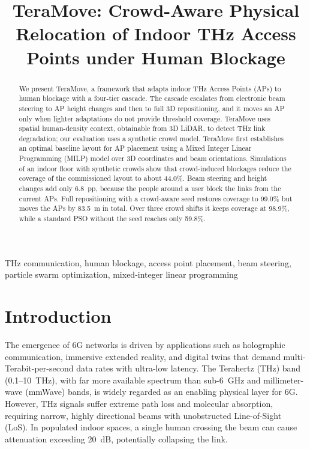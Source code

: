 \documentclass[conference]{IEEEtran}
\begin{document}
	\author{
		}

	\title{TeraMove: Crowd-Aware Physical Relocation of Indoor THz Access Points under Human Blockage}

	\maketitle

	\begin{abstract}
		We present TeraMove, a framework that adapts indoor THz Access Points (APs) to human blockage with a four-tier cascade. The cascade escalates from electronic beam steering to AP height changes and then to full 3D repositioning, and it moves an AP only when lighter adaptations do not provide threshold coverage. TeraMove
		uses spatial human-density context, obtainable from 3D LiDAR, to detect THz link degradation; our evaluation uses a synthetic crowd model.
		TeraMove first establishes an optimal baseline layout for AP placement using a Mixed Integer Linear Programming (MILP) model over 3D
		coordinates and beam orientations.
		Simulations of an indoor floor with synthetic crowds show that crowd-induced
		blockages reduce the coverage of the commissioned layout to about 44.0\%. Beam steering and height changes add only 6.8~pp, because the people around a user block the links from the current APs. Full repositioning with a crowd-aware seed restores coverage to 99.0\% but moves the APs by 83.5~m in total. Over three crowd shifts it keeps coverage at 98.9\%, while a standard PSO without the seed reaches only 59.8\%.
	\end{abstract}

	\begin{IEEEkeywords}
		THz communication, human blockage, access point placement, beam steering, particle swarm optimization, mixed-integer linear programming
	\end{IEEEkeywords}

	\section{Introduction}

	The emergence of 6G networks is driven by applications such as holographic communication, immersive extended reality, and digital twins that demand multi-Terabit-per-second data rates with ultra-low latency. The Terahertz (THz) band (0.1--10~THz), with far more available spectrum than sub-6~GHz and millimeter-wave (mmWave) bands, is widely regarded as an enabling physical layer for 6G. However, THz signals suffer extreme path loss and molecular absorption, requiring narrow, highly directional beams with unobstructed Line-of-Sight (LoS). In populated indoor spaces, a single human crossing the beam can cause attenuation exceeding 20~dB, potentially collapsing the link.
\end{document}
